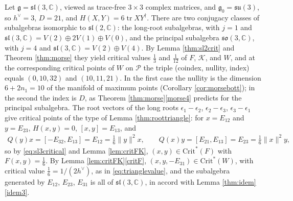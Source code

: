 \documentclass [leqno, 10pt]{amsart}
\theoremstyle{definition}
\numberwithin{equation}{section}
\newcommand{\sect}{\mathscr{K}}
\newcommand{\so}{\mathfrak{so}}
\newcommand{\ep}{\epsilon}
\newcommand{\su}{\mathfrak{su}}
\newcommand{\sll}{\mathfrak{sl}}
\newcommand{\g}{\mathfrak{g}}
\newcommand{\com}{\mathbb C}
\newcommand{\tr}{\operatorname{tr}}
\newcommand{\crtnt}{\mathrm{Crit}^*}
\newcommand{\hv}{h^\vee}
\newcommand{\norm}[1]{\lVert #1\rVert}
\newcommand{\qad}{Q}
\begin{document}
\begin{example}\label{ex:sl3}
Let $\g = \sll(3, \com)$, viewed as trace-free $3\times 3$ complex matrices, and $\g_{0} = \su(3)$, so $\hv = 3$, $D = 21$, and $H(X, Y) = 6\tr XY^{\dagger}$. There are two conjugacy classes of subalgebras isomorphic to $\sll(2, \com)$: the long-root subalgebras, with $j = 1$ and $\sll(3, \com) = V(2) \oplus 2V(1) \oplus V(0)$, and the principal subalgebra $\so(3, \com)$, with $j = 4$ and $\sll(3, \com) = V(2) \oplus V(4)$. By Lemma \ref{thm:sl2crit} and Theorem \ref{thm:morse} they yield critical values $\tfrac{1}{3}$ and $\tfrac{1}{12}$ of $F$, $\sect$, and $W$, and at the corresponding critical points of $W$ on $\mathcal{P}$ the triple (coindex, nullity, index) equals $(0, 10, 32)$ and $(10, 11, 21)$. In the first case the nullity is the dimension $6 + 2n_{1} = 10$ of the manifold of maximum points (Corollary \ref{cor:morsebott}); in the second the index is $D$, as Theorem \ref{thm:morse}\ref{morse4} predicts for the principal subalgebra. The root vectors of the long roots $\ep_{1} - \ep_{2}$, $\ep_{2} - \ep_{3}$, $\ep_{3} - \ep_{1}$ give critical points of the type of Lemma \ref{thm:roottriangle}: for $x = E_{12}$ and $y = E_{23}$, $H(x, y) = 0$, $[x, y] = E_{13}$, and
\begin{align}\label{eq:sl3critical}
\qad(y)x = [-E_{32}, E_{13}] = E_{12} = \tfrac{1}{6}\norm{y}^{2}x, \qquad \qad(x)y = [E_{21}, E_{13}] = E_{23} = \tfrac{1}{6}\norm{x}^{2}y,
\end{align}
so by \eqref{eq:sl3critical} and Lemma \ref{lem:critFK}, $(x, y) \in \crtnt(F)$ with $F(x, y) = \tfrac{1}{6}$. By Lemma \ref{lem:critFK}\ref{critF}, $(x, y, -E_{31}) \in \crtnt(W)$, with critical value $\tfrac{1}{6} = 1/(2\hv)$, as in \eqref{eq:trianglevalue}, and the subalgebra generated by $E_{12}$, $E_{23}$, $E_{31}$ is all of $\sll(3, \com)$, in accord with Lemma \ref{thm:idem}\ref{idem3}.
\end{example}
\end{document}
